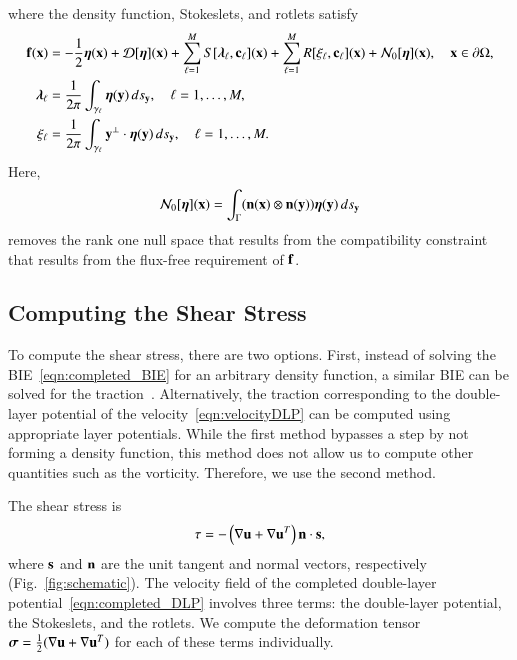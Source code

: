 \documentclass[preprint, 10pt]{elsarticle}
\begin{document}
where the density function, Stokeslets, and rotlets satisfy
\begin{subequations}
\label{eqn:completed_BIE}
\begin{align}
  \ff(\xx) &= -\frac{1}{2}\eeta(\xx) + \DD[\eeta](\xx) + 
      \sum_{\ell=1}^{M} S[\llambda_\ell,\cc_\ell](\xx) +
      \sum_{\ell=1}^{M} R[\xi_\ell,\cc_\ell](\xx) + \NN_0[\eeta](\xx),
      \quad \xx \in \bd\Omega, 
      \label{eqn:DLP}\\
  \llambda_\ell &= \frac{1}{2\pi}\int_{\gamma_\ell} \eeta(\yy) \, ds_\yy,
  \quad \ell=1,\ldots,M,
  \label{eqn:stokeslet} \\
  \xi_\ell &= \frac{1}{2\pi}\int_{\gamma_\ell} \yy^\perp \cdot \eeta(\yy)
  \, ds_\yy, \quad \ell=1,\ldots,M.
  \label{eqn:rotlet}
\end{align}
\end{subequations}
Here,
\begin{align*}
  \NN_0[\eeta](\xx) = \int_{\Gamma} 
    (\nn(\xx) \otimes \nn(\yy))\eeta(\yy) \, ds_\yy
\end{align*}
removes the rank one null space that results from the compatibility
constraint that results from the flux-free requirement of $\ff$.


\subsection{Computing the Shear Stress}
\label{sec:shearStressLP}
To compute the shear stress, there are two options.  First, instead of
solving the BIE~\eqref{eqn:completed_BIE} for an arbitrary density
function, a similar BIE can be solved for the
traction~\cite{mit-spa2016}.  Alternatively, the traction corresponding
to the double-layer potential of the velocity~\eqref{eqn:velocityDLP}
can be computed using appropriate layer potentials.  While the first
method bypasses a step by not forming a density function, this method
does not allow us to compute other quantities such as the vorticity.
Therefore, we use the second method.

The shear stress is
\begin{align*}
  \tau = -\left(\nabla \uu + \nabla \uu^T \right)\nn \cdot \ss,
\end{align*}
where $\ss$ and $\nn$ are the unit tangent and normal vectors,
respectively (Fig.~\ref{fig:schematic}).  The velocity field of the
completed double-layer potential~\eqref{eqn:completed_DLP} involves
three terms: the double-layer potential, the Stokeslets, and the
rotlets.  We compute the deformation tensor $\ssigma =
\frac{1}{2}(\nabla\uu + \nabla\uu^T)$ for each of these terms
individually.
\end{document}
